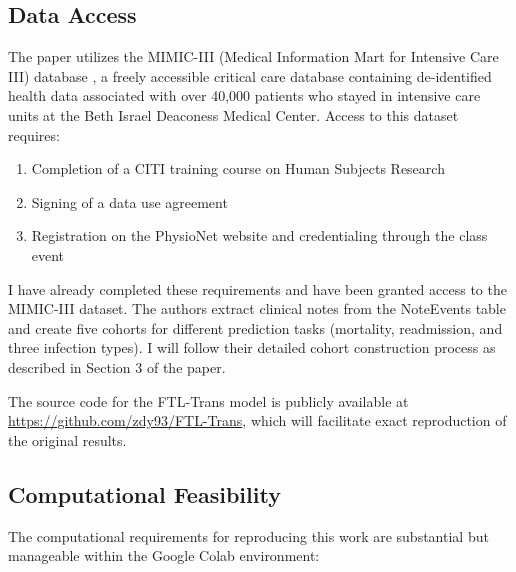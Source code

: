 \documentclass[10pt,letterpaper,twocolumn]{article}
\begin{document}
\subsection{Data Access}

The paper utilizes the MIMIC-III (Medical Information Mart for Intensive Care III) database \cite{johnson2016mimic}, a freely accessible critical care database containing de-identified health data associated with over 40,000 patients who stayed in intensive care units at the Beth Israel Deaconess Medical Center. Access to this dataset requires:

\begin{enumerate}[leftmargin=*]
    \item Completion of a CITI training course on Human Subjects Research
    \item Signing of a data use agreement
    \item Registration on the PhysioNet website and credentialing through the class event
\end{enumerate}

I have already completed these requirements and have been granted access to the MIMIC-III dataset. The authors extract clinical notes from the NoteEvents table and create five cohorts for different prediction tasks (mortality, readmission, and three infection types). I will follow their detailed cohort construction process as described in Section 3 of the paper.

The source code for the FTL-Trans model is publicly available at \url{https://github.com/zdy93/FTL-Trans}, which will facilitate exact reproduction of the original results.

\subsection{Computational Feasibility}

The computational requirements for reproducing this work are substantial but manageable within the Google Colab environment:
\end{document}

